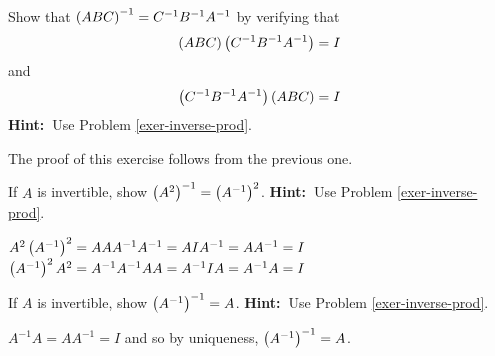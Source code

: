 \begin{enumialphparenastyle}
\begin{ex}Show that $\left(ABC\right) ^{-1}=C^{-1}B^{-1}A^{-1}$ by verifying
that 
\[
\left(ABC\right) \left(C^{-1}B^{-1}A^{-1}\right) =I
\]
and 
\[\left(C^{-1}B^{-1}A^{-1}\right)\left(ABC\right) =I
\] 
\textbf{Hint:\ }Use Problem \ref{exer-inverse-prod}. 
\begin{sol}
The proof of this exercise follows from the previous one.
\end{sol}
\end{ex}

\begin{ex}If $A$ is invertible, show $\left(A^{2}\right) ^{-1}=\left(
A^{-1}\right) ^{2}$. \textbf{Hint:\ }Use Problem \ref{exer-inverse-prod}. 
\begin{sol}
$A^{2}\left(A^{-1}\right) ^{2}=AAA^{-1}A^{-1}=AIA^{-1}=AA^{-1}=I$ $\left(
A^{-1}\right) ^{2}A^{2}=A^{-1}A^{-1}AA=A^{-1}IA=A^{-1}A=I$
\end{sol}
\end{ex}

\begin{ex}If $A$ is invertible, show $\left(A^{-1}\right) ^{-1}=A$. 
\textbf{Hint:\ }Use Problem \ref{exer-inverse-prod}. 
\begin{sol}
 $A^{-1}A=AA^{-1}=I$ and so by
uniqueness, $\left(A^{-1}\right) ^{-1}=A$.
\end{sol}
\end{ex}

\end{enumialphparenastyle}

